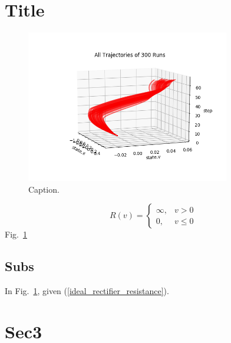 \section{Title}


\begin{figure}
  \begin{center}
  \includegraphics[width=3.5in]{img/0.png}
  \caption{Caption.}\label{circuit_diagram}
  \end{center}
\end{figure}

\begin{equation}\label{ideal_rectifier_resistance}
R(v) =
\begin{cases}
    \infty, & v > 0\\
    0, & v \leq 0
\end{cases}
\end{equation}
 Fig.~\ref{circuit_diagram} 

\subsection {Subs}

In Fig.~\ref{circuit_diagram}, given (\ref{ideal_rectifier_resistance}).


\section{Sec3}




